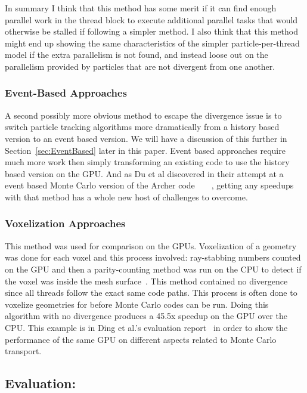 In summary I think that this method has some merit if it can find enough parallel work in the thread block to execute additional parallel tasks that would otherwise be stalled if following a simpler method.
%
I also think that this method might end up showing the same characteristics of the simpler particle-per-thread model if the extra parallelism is not found, and instead loose out on the parallelism provided by particles that are not divergent from one another. 

\subsubsection*{\textbf{Event-Based Approaches}}

A second possibly more obvious method to escape the divergence issue is to switch particle tracking algorithms more dramatically from a history based version to an event based version.
%
We will have a discussion of this further in Section~\ref{sec:EventBased} later in this paper.
%
Event based approaches require much more work then simply transforming an existing code to use the history based version on the GPU.
%
And as Du et al discovered in their attempt at a event based Monte Carlo version of the Archer code~\cite{xu2015archer}~\cite{du2013evaluation}~\cite{liu2015comparison}~\cite{su2013monte},  getting any speedups with that method has a whole new host of challenges to overcome.

\subsubsection*{\textbf{Voxelization Approaches}}

This method was used for comparison on the GPUs.
%
Voxelization of a geometry was done for each voxel and this process involved: ray-stabbing numbers counted on the GPU and then a parity-counting method was run on the CPU to detect if the voxel was inside the mesh surface~\cite{na2010deformable}.
%
This method contained no divergence since all threads follow the exact same code paths.
%
This process is often done to voxelize geometries for before Monte Carlo codes can be run.
%
Doing this algorithm with no divergence produces a 45.5x speedup on the GPU over the CPU.
%
This example is in Ding et al.'s evaluation report~\cite{ding2011evaluation} in order to show the performance of the same GPU on different aspects related to Monte Carlo transport.

\subsection*{ \textbf{Evaluation:}}

